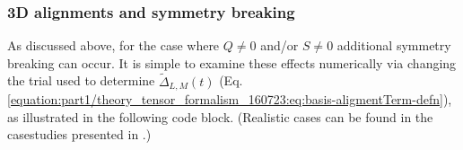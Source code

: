 \documentclass[letterpaper,table,10pt,english]{jupyterBook}
\begin{document}
\subsubsection{3D alignments and symmetry breaking}
\label{\detokenize{part1/theory_tensor_formalism_160723:d-alignments-and-symmetry-breaking}}\label{\detokenize{part1/theory_tensor_formalism_160723:sec-theory-af-alignment-term-3d}}
\sphinxAtStartPar
As discussed above, for the case where \(Q\neq0\) and/or \(S\neq0\) additional symmetry breaking can occur. It is simple to examine these effects numerically via changing the trial {\hyperref[\detokenize{backmatter/glossary:term-ADMs}]{}} used to determine \(\tilde{\Delta}_{L,M}(t)\) (Eq. \eqref{equation:part1/theory_tensor_formalism_160723:eq:basis-aligmentTerm-defn}), as illustrated in the following code block. (Realistic cases can be found in the case\sphinxhyphen{}studies presented in {\hyperref[\detokenize{part2/extracting_matrix_elements_overview_270423:chpt-extracting-matrix-elements-overview}]{}}.)
\end{document}
